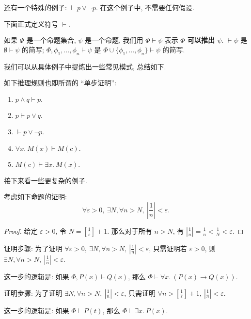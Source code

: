 还有一个特殊的例子: $\vdash p \vee \neg p$. 在这个例子中, 不需要任何假设.

下面正式定义符号 $\vdash$.

\begin{definition}
    如果 $\Phi$ 是一个命题集合, $\psi$ 是一个命题, 我们用 $\Phi \vdash \psi$ 表示 \textbf{$\Phi$ 可以推出 $\psi$}. $\vdash\psi$ 是 $\emptyset \vdash \psi$ 的简写; $\Phi, \phi_1, \dots, \phi_n \vdash \psi$ 是 $\Phi \cup \{\phi_1, \dots, \phi_n\} \vdash \psi$ 的简写.
\end{definition}

我们可以从具体例子中提炼出一些常见模式, 总结如下. 

\begin{example}
    如下推理规则也即所谓的 ``单步证明'':
    \begin{enumerate}[itemindent=0ex, itemsep=0pt, label=\upshape{(\alph*)}]
        \item $p\wedge q\vdash p$. 
        \item $p\vdash p\vee q$.
        \item $\vdash p\vee \neg p$.
        \item $\forall x.\ M(x)\vdash M(c)$.
        \item $M(c)\vdash \exists x.\ M(x)$.
    \end{enumerate}
\end{example}

接下来看一些更复杂的例子.

\begin{example}
    考虑如下命题的证明:
    \[\forall\varepsilon>0,\ \exists N, \forall n>N,\ \left|\frac{1}{n}\right|<\varepsilon.\]

    \begin{proof}
        给定 $\varepsilon>0$, 令 $N=\left[ \frac{1}{\varepsilon} \right]+1$. 那么对于所有 $n>N$, 有 $\left|\frac{1}{n}\right|=\frac{1}{n}<\frac{1}{N}<\varepsilon$. 
    \end{proof}

    证明步骤: 为了证明 $\forall\varepsilon>0,\ \exists N, \forall n>N,\ \left|\frac{1}{n}\right|<\varepsilon$, 只需证明若 $\varepsilon>0$, 则 $\exists N, \forall n>N,\ \left|\frac{1}{n}\right|<\varepsilon$.

    这一步的逻辑是: 如果 $\Phi, P(x)\vdash Q(x)$, 那么 $\Phi\vdash \forall x.\ (P(x)\rightarrow Q(x))$. 
    
    \mbox{}

    证明步骤: 为了证明 $\exists N, \forall n>N,\ \left|\frac{1}{n}\right|<\varepsilon$, 只需证明 $\forall n>\left[ \frac{1}{\varepsilon} \right]+1,\ \left|\frac{1}{n}\right|<\varepsilon$.

    这一步的逻辑是: 如果 $\Phi\vdash P(t)$, 那么 $\Phi\vdash \exists x.\ P(x)$.
\end{example}

